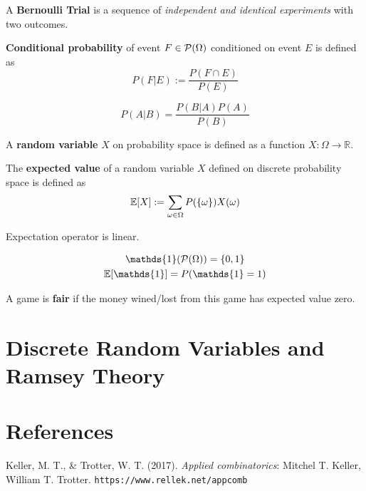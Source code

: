 \documentclass{article}
\def\R{{\mathbb R}}
\begin{document}
		\begin{definition}
			A \textbf{Bernoulli Trial} is a sequence of \emph{independent and identical experiments} with two outcomes.
		\end{definition}
		
		\begin{definition}
			\textbf{Conditional probability} of event $F \in \mathcal{{P}}(\Omega)$ conditioned on event $E$ is defined as 
			\begin{equation}
				P(F|E) := \frac{P(F \cap E)}{P(E)}
			\end{equation}
		\end{definition}
		
		\begin{theorem}
			\begin{equation}
				P(A|B) = \frac{P(B|A)P(A)}{P(B)}
			\end{equation}
		\end{theorem}
		
		\begin{definition}
			A \textbf{random variable} $X$ on probability space is defined as a function $X: \Omega \to \R$.
		\end{definition}
		
		\begin{definition}
			The \textbf{expected value} of a random variable $X$ defined on discrete probability space is defined as 
			\begin{equation}
				\mathbb{E}[{X}] := \sum_{\omega \in \Omega} P(\{\omega\})X(\omega)
			\end{equation}
		\end{definition}
		
		\begin{proposition}
			Expectation operator is linear.
		\end{proposition}
		
		\begin{proposition}
			\begin{gather}
				\mathds{1}(\mc{P}(\Omega)) = \{0, 1\} \\
				\expect{\mathds{1}} = P(\mathds{1} = 1)
			\end{gather}
		\end{proposition}
		
		\begin{definition}
			A game is \textbf{fair} if the money wined/lost from this game has expected value zero.
		\end{definition}
		
	\section{Discrete Random Variables and Ramsey Theory}
			
	\newpage
	\section*{References}
		\par Keller, M. T., \& Trotter, W. T. (2017). \emph{Applied combinatorics}: Mitchel T. Keller, William T. Trotter. \texttt{https://www.rellek.net/appcomb}
\end{document}
